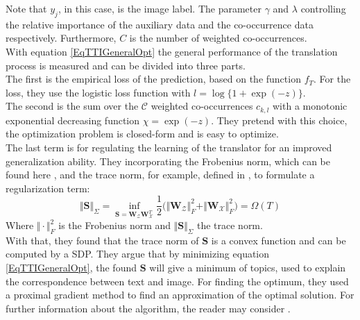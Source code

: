 Note that $y_j$, in this case, is the image label.
The parameter $\gamma$ and $\lambda$ controlling the relative importance of the auxiliary data and the co-occurrence data respectively.
Furthermore, $C$ is the number of weighted co-occurrences.\\
With equation \eqref{EqTTIGeneralOpt} the general performance of the translation process is measured and can be divided into three parts.\\
The first is the empirical loss of the prediction, based on the function $f_T$.\cite{Qi.2011}
For the loss, they use the logistic loss function with $l = \log\{1+\exp(-z) \}$.\\
The second is the sum over the $\mathcal{C}$ weighted co-occurrences $c_{k,l}$ with a monotonic exponential decreasing function $\chi = \exp(-z)$.
They pretend with this choice, the optimization problem is closed-form and is easy to optimize.\\
The last term is for regulating the learning of the translator for an improved generalization ability.
They incorporating the Frobenius norm, which can be found here \cite{Ma.1994}, and the trace norm, for example, defined in \cite{Rennie.2005}, to formulate a regularization term:\cite{Qi.2011}
\begin{equation}\label{EqTTITrace}
\Vert \mathbf{S}\Vert_\Sigma = \inf_{\mathbf{S} = \mathbf{W}_\mathcal{Z} \mathbf{W}_\mathcal{X}^T} \frac{1}{2}\bigg(\Vert\mathbf{W}_\mathcal{Z}\Vert_F^2 + \Vert\mathbf{W}_\mathcal{X}\Vert_F^2 \bigg) = \Omega(T)
\end{equation}
Where $\Vert \cdot \Vert_F^2$ is the Frobenius norm and $\Vert \mathbf{S}\Vert_\Sigma$ the trace norm.\\
With that, they found that the trace norm of $\mathbf{S}$ is a convex function and can be computed by a \acl{SDP}.
They argue that by minimizing equation \eqref{EqTTIGeneralOpt}, the found $\mathbf{S}$ will give a minimum of topics, used to explain the correspondence between text and image.
For finding the optimum, they used a proximal gradient method to find an approximation of the optimal solution.
For further information about the algorithm, the reader may consider \cite{Qi.2011}.

